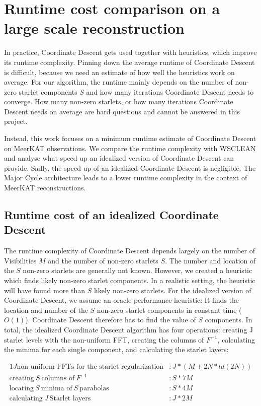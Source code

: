 \section{Runtime cost comparison on a large scale reconstruction}

In practice, Coordinate Descent gets used together with heuristics, which improve its runtime complexity. Pinning down the average runtime of Coordinate Descent is difficult, because we need an estimate of how well the heuristics work on average. For our algorithm, the runtime mainly depends on the number of non-zero starlet components $S$ and how many iterations Coordinate Descent needs to converge. How many non-zero starlets, or how many iterations Coordinate Descent needs on average are hard questions and cannot be answered in this project.

Instead, this work focuses on a minimum runtime estimate of Coordinate Descent on MeerKAT observations. We compare the runtime complexity with WSCLEAN and analyse what speed up an idealized version of Coordinate Descent can provide. Sadly, the speed up of an idealized Coordinate Descent is negligible. The Major Cycle architecture leads to a lower runtime complexity in the context of MeerKAT reconstructions.


\subsection{Runtime cost of an idealized Coordinate Descent}
The runtime complexity of Coordinate Descent depends largely on the number of Visibilities $M$ and the number of non-zero starlets $S$. The number and location of the $S$ non-zero starlets are generally not known. However, we created a heuristic which finds likely non-zero starlet components. In a realistic setting, the heuristic will have found more than $S$ likely non-zero starlets. For the idealized version of Coordinate Descent, we assume an oracle performance heuristic: It finds the location and number of the $S$ non-zero starlet components in constant time ($O(1)$). Coordinate Descent therefore has to find the value of $S$  components. In total, the idealized Coordinate Descent algorithm has four operations: creating J starlet levels with the non-uniform FFT, creating the columns of $F^{-1}$, calculating the minima for each single component, and calculating the starlet layers:

\begin{alignat*}{1}
J \text{non-uniform FFTs for the starlet regularization} &: J*(M + 2N*ld(2N))\\
\text{creating} \:S\: \text{columns of}\: F^{-1} &: S*7M\\
\text{locating} \:S\: \text{minima of} \:S\: \text{parabolas} &: S*4M\\
\text{calculating} \:J\: \text{Starlet layers} &: J * 2M
\end{alignat*}

